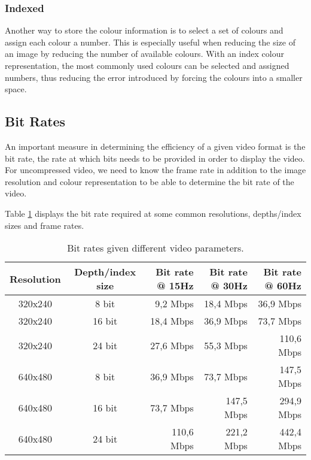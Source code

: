 \subsubsection{Indexed}
Another way to store the colour information is to select a set of colours and assign each colour a number.
This is especially useful when reducing the size of an image by reducing the number of available colours.
With an index colour representation, the most commonly used colours can be selected and assigned numbers, thus reducing the error introduced by forcing the colours into a smaller space.

\subsection{Bit Rates}
An important measure in determining the efficiency of a given video format is the bit rate, the rate at which bits needs to be provided in order to display the video.
For uncompressed video, we need to know the frame rate in addition to the image resolution and colour representation to be able to determine the bit rate of the video.

Table \ref{tab:BitRates} displays the bit rate required at some common resolutions, depths/index sizes and frame rates.
\begin{table}[]
    \centering
    \begin{tabular}{ccrrr}
        Resolution & Depth/index size & Bit rate @ 15Hz & Bit rate @ 30Hz & Bit rate @ 60Hz \\
        \hline
        320x240 & 8 bit & 9,2 Mbps   & 18,4 Mbps  & 36,9 Mbps  \\
        320x240 & 16 bit & 18,4 Mbps  & 36,9 Mbps  & 73,7 Mbps  \\
        320x240 & 24 bit & 27,6 Mbps  & 55,3 Mbps  & 110,6 Mbps \\
        640x480 & 8 bit & 36,9 Mbps  & 73,7 Mbps  & 147,5 Mbps \\
        640x480 & 16 bit & 73,7 Mbps  & 147,5 Mbps & 294,9 Mbps \\
        640x480 & 24 bit & 110,6 Mbps & 221,2 Mbps & 442,4 Mbps
    \end{tabular}
    \caption{Bit rates given different video parameters.}
    \label{tab:BitRates}
\end{table}
